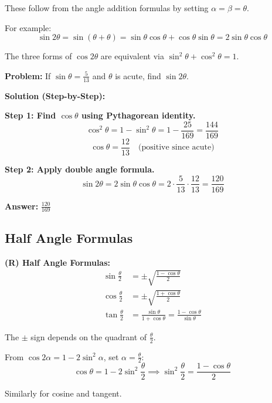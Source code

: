 \documentclass[12pt]{extarticle}
\begin{document}
\begin{conceptbox}[Derivation]
These follow from the angle addition formulas by setting $\alpha = \beta = \theta$.

For example:
\[
\sin 2\theta = \sin(\theta + \theta) = \sin\theta\cos\theta + \cos\theta\sin\theta = 2\sin\theta\cos\theta
\]

The three forms of $\cos 2\theta$ are equivalent via $\sin^2\theta + \cos^2\theta = 1$.
\end{conceptbox}

\begin{examplebox}
\textbf{Problem:} If $\sin\theta = \frac{5}{13}$ and $\theta$ is acute, find $\sin 2\theta$.

\textbf{Solution (Step-by-Step):}

\textbf{Step 1: Find $\cos\theta$ using Pythagorean identity.}
\[
\cos^2\theta = 1 - \sin^2\theta = 1 - \frac{25}{169} = \frac{144}{169}
\]
\[
\cos\theta = \frac{12}{13} \quad \text{(positive since acute)}
\]

\textbf{Step 2: Apply double angle formula.}
\[
\sin 2\theta = 2\sin\theta\cos\theta = 2 \cdot \frac{5}{13} \cdot \frac{12}{13} = \frac{120}{169}
\]

\textbf{Answer:} $\boxed{\frac{120}{169}}$
\end{examplebox}

\subsection{Half Angle Formulas}

\begin{theorembox}
\textbf{(R) Half Angle Formulas:}
\begin{align}
\sin\frac{\theta}{2} &= \pm\sqrt{\frac{1 - \cos\theta}{2}} \\
\cos\frac{\theta}{2} &= \pm\sqrt{\frac{1 + \cos\theta}{2}} \\
\tan\frac{\theta}{2} &= \frac{\sin\theta}{1 + \cos\theta} = \frac{1 - \cos\theta}{\sin\theta}
\end{align}

The $\pm$ sign depends on the quadrant of $\frac{\theta}{2}$.
\end{theorembox}

\begin{conceptbox}[Derivation]
From $\cos 2\alpha = 1 - 2\sin^2\alpha$, set $\alpha = \frac{\theta}{2}$:
\[
\cos\theta = 1 - 2\sin^2\frac{\theta}{2} \implies \sin^2\frac{\theta}{2} = \frac{1 - \cos\theta}{2}
\]

Similarly for cosine and tangent.
\end{conceptbox}
\end{document}
